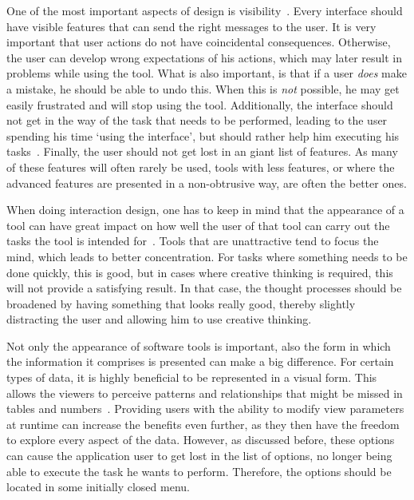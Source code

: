 One of the most important aspects of design is visibility~\cite{norman2002design}. Every interface should have visible features that can send the right messages to the user. It is very important that user actions do not have coincidental consequences. Otherwise, the user can develop wrong expectations of his actions, which may later result in problems while using the tool. What is also important, is that if a user \emph{does} make a mistake, he should be able to undo this. When this is \emph{not} possible, he may get easily frustrated and will stop using the tool. Additionally, the interface should not get in the way of the task that needs to be performed, leading to the user spending his time `using the interface', but should rather help him executing his tasks~\cite{norman1990interfaces}. Finally, the user should not get lost in an giant list of features. As many of these features will often rarely be used, tools with less features, or where the advanced features are presented in a non-obtrusive way, are often the better ones.

When doing interaction design, one has to keep in mind that the appearance of a tool can have great impact on how well the user of that tool can carry out the tasks the tool is intended for~\cite{norman2002emotion}. Tools that are unattractive tend to focus the mind, which leads to better concentration. For tasks where something needs to be done quickly, this is good, but in cases where creative thinking is required, this will not provide a satisfying result. In that case, the thought processes should be broadened by having something that looks really good, thereby slightly distracting the user and allowing him to use creative thinking.

Not only the appearance of software tools is important, also the form in which the information it comprises is presented can make a big difference. For certain types of data, it is highly beneficial to be represented in a visual form. This allows the viewers to perceive patterns and relationships that might be missed in tables and numbers~\cite{gallopoulos1994computer}. Providing users with the ability to modify view parameters at runtime can increase the benefits even further, as they then have the freedom to explore every aspect of the data. However, as discussed before, these options can cause the application user to get lost in the list of options, no longer being able to execute the task he wants to perform. Therefore, the options should be located in some initially closed menu.

